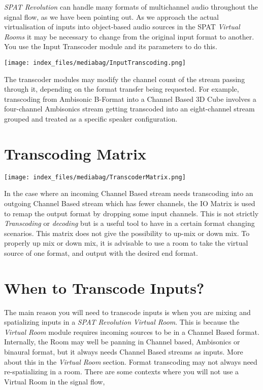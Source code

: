 \documentclass[
  letterpaper,
  DIV=11,
  numbers=noendperiod]{scrreport}
\begin{document}
\emph{SPAT Revolution} can handle many formats of multichannel audio
throughout the signal flow, as we have been pointing out. As we approach
the actual virtualisation of inputs into object-based audio sources in
the SPAT \emph{Virtual Rooms} it may be necessary to change from the
original input format to another. You use the Input Transcoder module
and its parameters to do this.

\texttt{[image: index\_files/mediabag/InputTranscoding.png]}

The transcoder modules may modify the channel count of the stream
passing through it, depending on the format transfer being requested.
For example, transcoding from Ambisonic B-Format into a Channel Based 3D
Cube involves a four-channel Ambisonics stream getting transcoded into
an eight-channel stream grouped and treated as a specific speaker
configuration.

\hypertarget{transcoding-matrix}{%
\section{Transcoding Matrix}\label{transcoding-matrix}}

\texttt{[image: index\_files/mediabag/TranscoderMatrix.png]}

In the case where an incoming Channel Based stream needs transcoding
into an outgoing Channel Based stream which has fewer channels, the IO
Matrix is used to remap the output format by dropping some input
channels. This is not strictly \emph{Transcoding} or \emph{decoding} but
is a useful tool to have in a certain format changing scenarios. This
matrix does not give the possibility to up-mix or down mix. To properly
up mix or down mix, it is advisable to use a room to take the virtual
source of one format, and output with the desired end format.

\hypertarget{when-to-transcode-inputs}{%
\section{When to Transcode Inputs?}\label{when-to-transcode-inputs}}

The main reason you will need to transcode inputs is when you are mixing
and spatializing inputs in a \emph{SPAT Revolution} \emph{Virtual Room}.
This is because the \emph{Virtual Room} module requires incoming sources
to be in a Channel Based format. Internally, the Room may well be
panning in Channel based, Ambisonics or binaural format, but it always
needs Channel Based streams as inputs. More about this in the
\emph{Virtual Room} section. Format transcoding may not always need
re-spatializing in a room. There are some contexts where you will not
use a Virtual Room in the signal flow,
\end{document}
